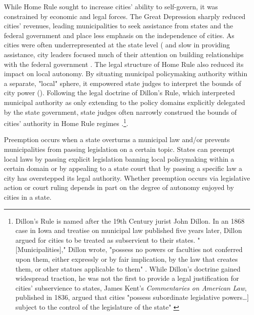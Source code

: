 \documentclass[12pt]{article}
\begin{document}
While Home Rule sought to increase cities' ability to self-govern, it was constrained by economic and legal forces. The Great Depression sharply reduced cities' revenues, leading municipalities to seek assistance from states and the federal government and place less emphasis on the independence of cities. As cities were often underrepresented at the state level (\cites{ansolabehereEndInequalityOne2008}[p. 64-67]{bermanLocalGovernmentStates2003} and slow in providing assistance, city leaders focused much of their attention on building relationships with the federal government \parencite[p. 64-65]{bermanLocalGovernmentStates2003}. The legal structure of Home Rule also reduced its impact on local autonomy. By situating municipal policymaking authority within a separate, "local" sphere, it empowered state judges to interpret the bounds of city power (\cites[p. 1125]{dillerIntrastatePreemption2007}[p. 12]{kraneHomeRuleAmerica2000}). Following the legal doctrine of Dillon's Rule, which interpreted municipal authority as only extending to the policy domains explicitly delegated by the state government, state judges often narrowly construed the bounds of cities' authority in Home Rule regimes \parencite[p. 1125]{dillerIntrastatePreemption2007}.\footnote{Dillon's Rule is named after the 19th Century jurist John Dillon. In an 1868 case in Iowa and treatise on municipal law published five years later, Dillon argued for cities to be treated as subservient to their states. "[Municipalities]," Dillon wrote, "possess no powers or faculties not conferred upon them, either expressly or by fair implication, by the law that creates them, or other statues applicable to them" \parencite[p. 93]{dillonLawMunicipalCorporations1873}. While Dillon's doctrine gained widespread traction, he was not the first to provide a legal justification for cities' subservience to states, James Kent's \textit{Commentaries on American Law}, published in 1836, argued that cities "possess subordinate legislative powers\ldots] subject to the control of the legislature of the state" \parencite[Quoted in ][p. 9]{kraneHomeRuleAmerica2000}}.





Preemption occurs when a state overturns a municipal law and/or prevents municipalities from passing legislation on a certain topic. States can preempt local laws by passing explicit legislation banning local policymaking within a certain domain or by appealing to a state court that by passing a specific law a city has overstepped its legal authority. Whether preemption occurs via legislative action or court ruling depends in part on the degree of autonomy enjoyed by cities in a state.
\end{document}
